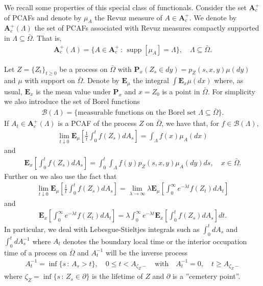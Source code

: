 \documentclass[11pt,a4paper]{article}
\begin{document}
We recall some properties of this special class of functionals. Consider the set $\mathbf{A}^+_c$ of PCAFs and denote by $\mu_A$ the Revuz measure of $A \in \mathbf{A}^+_c$. We denote by $\mathbf{A}^+_c(\Lambda)$ the set of PCAFs associated with Revuz measures compactly supported in $\Lambda \subseteq \bar{\Omega}$. That is, 
\begin{align*}
\mathbf{A}^+_c(\Lambda)=\{A \in \mathbf{A}^+_c \,:\, \operatorname{supp}[\mu_A] = \Lambda\}, \quad \Lambda \subseteq \bar{\Omega}.
\end{align*}

Let $Z=\{Z_t\}_{t\geq 0}$ be a process on $\bar{\Omega}$ with $\mathbf{P}_x(Z_s \in dy) = p_Z(s,x,y)\mu(dy)$ and $\mu$ with support on $\bar{\Omega}$. Denote by $\mathbf{E}_\mu$ the integral $\int \mathbf{E}_x \mu(dx)$ where, as usual, $\mathbf{E}_x$ is the mean value under $\mathbf{P}_x$ and $x=Z_0$ is a point in $\bar{\Omega}$. For simplicity we also introduce the set of Borel functions 
\begin{align*}
\mathcal{B}(\Lambda) = \{ \textrm{measurable functions on the Borel set $\Lambda\subseteq \bar{\Omega}$}\}.
\end{align*} 
If $A_t \in \mathbf{A}^+_c(\Lambda)$ is a PCAF of the process $Z$ on $\bar{\Omega}$, we have that, for $f \in \mathcal{B}(\Lambda)$,
\begin{align}
\label{limitRevuz}
\lim_{t \downarrow 0} \mathbf{E}_\mu \left[ \frac{1}{t} \int_0^t f(Z_s) dA_s \right] = \int_{\Lambda} f(x) \mu_A(dx)
\end{align}
and  
\begin{align}
\label{INTmuA}
\mathbf{E}_x \left[ \int_0^t f(Z_s)dA_s \right] = \int_0^t \int_\Lambda f(y) p_Z(s,x,y) \mu_A(dy) ds, \quad x \in \bar{\Omega}.
\end{align}
Further on we also use the fact that
\begin{align}
\label{limitRESadditive}
\lim_{t \downarrow 0} \mathbf{E}_\mu \left[ \frac{1}{t} \int_0^t f(Z_s) dA_s \right] = \lim_{\lambda \to \infty} \lambda \mathbf{E}_\mu \left[\int_0^\infty e^{-\lambda t} f(Z_t) dA_t \right]
\end{align}
and
\begin{align}
\label{potintdA}
\mathbf{E}_x \left[ \int_0^\infty e^{-\lambda t} f(Z_t)dA_t \right] = \lambda \int_0^\infty e^{-\lambda t} \mathbf{E}_x\left[ \int_0^t f(Z_s) dA_s \right] dt.
\end{align}
In particular, we deal with Lebesgue-Stieltjes integrals such as $\int_0^t dA_s$ and $\int_0^t dA^{-1}_s$ where $A_t$ denotes the boundary local time or the interior occupation time of a process on $\bar{\Omega}$ and $A^{-1}_t$ will be the inverse process
\begin{align*}
A^{-1}_t = \inf\{s\,:\, A_s>t\}, \quad 0\leq t < A_{\zeta_Z-} \quad \textrm{with} \quad  A^{-1}_t = 0, \quad t\geq A_{\zeta_Z -}
\end{align*}
where $\zeta_Z = \inf\{s\,:\, Z_s \in \partial \}$ is the lifetime of $Z$ and $\partial$ is a ''cemetery point''. 
\end{document}
